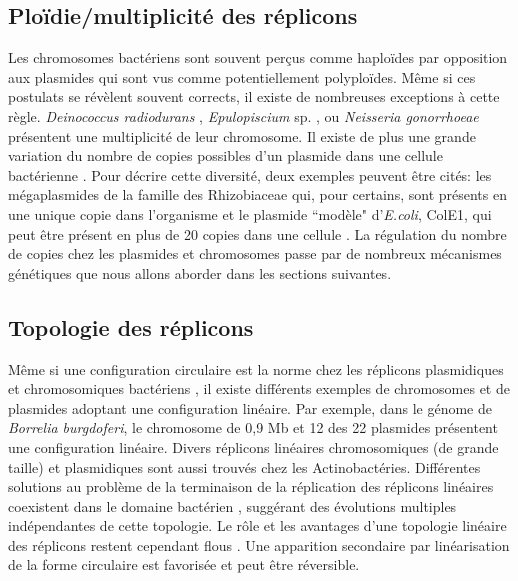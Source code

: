 \subsection{Ploïdie/multiplicité des réplicons}
 Les chromosomes bactériens sont souvent perçus comme haploïdes \citep{casjens1998diverse} par opposition aux plasmides qui sont vus comme potentiellement polyploïdes. Même si ces postulats se révèlent souvent corrects, il existe de nombreuses exceptions à cette règle. \textit{Deinococcus radiodurans} \citep{White1999}, \textit{Epulopiscium} sp. \citep{mendell2008extreme}, ou \textit{Neisseria gonorrhoeae} \citep{tobiason2006obligate} présentent une multiplicité de leur chromosome. Il existe de plus une grande variation du nombre de copies possibles d'un plasmide dans une cellule bactérienne \citep{helinski2004introduction}. Pour décrire cette diversité, deux exemples peuvent être cités: les mégaplasmides de la famille des Rhizobiaceae qui, pour certains, sont présents en une unique copie dans l'organisme \citep{Pinto2012} et le plasmide ``modèle" d'\textit{E.coli}, ColE1, qui peut être présent en plus de 20 copies dans une cellule \citep{summers1984multimerization}.
 La régulation du nombre de copies chez les plasmides et chromosomes passe par de nombreux mécanismes génétiques que nous allons aborder dans les sections suivantes.


 \subsection{Topologie des réplicons}
	Même si une configuration circulaire est la norme chez les réplicons plasmidiques et chromosomiques bactériens \citep{casjens1998diverse}, il existe différents exemples de chromosomes \citep{chaconas2005replication} et de plasmides \citep{stewart2004linear} adoptant une configuration linéaire. Par exemple, dans le génome de \textit{Borrelia burgdoferi}, le chromosome de 0,9 Mb et 12 des 22 plasmides présentent une configuration linéaire. Divers réplicons linéaires chromosomiques (de grande taille) et plasmidiques sont aussi trouvés chez les Actinobactéries. Différentes solutions au problème de la terminaison de la réplication des réplicons linéaires coexistent dans le domaine bactérien \citep{hinnebusch1993linear}, suggérant des évolutions multiples indépendantes de cette topologie. Le rôle et les avantages d'une topologie linéaire des réplicons restent cependant flous \citep{casjens1998diverse,chaconas2005replication}. Une apparition secondaire par linéarisation de la forme circulaire est favorisée \citep{volff2000new} et peut être réversible.
 

